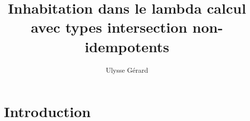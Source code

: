 \documentclass{article}
\title{\textbf{Inhabitation dans le lambda calcul avec types intersection non-idempotents}}
\author{Ulysse Gérard}
\begin{document}
\maketitle

\section{Introduction}
\end{document}

